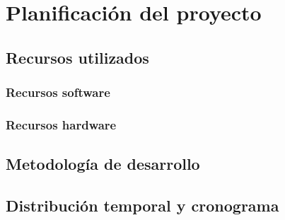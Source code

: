 \chapter{Planificación del proyecto} \label{chap:planificacion}


\section{Recursos utilizados} \label{sec:recursos_utilizados}


\subsection{Recursos software} \label{sec:recursos_software}


\subsection{Recursos hardware} \label{sec:recursos_hardware}


\section{Metodología de desarrollo} \label{sec:metodologia_desarrollo}


\section{Distribución temporal y cronograma} \label{sec:cronograma}
